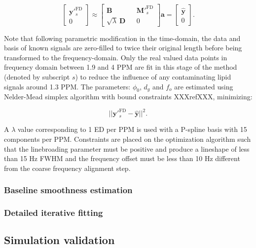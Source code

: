 \documentclass[num-refs]{wiley-article}
\begin{document}
\begin{equation}
  \begin{bmatrix}
    \textbf{y}'^{\mathrm{FD}}_{s} \\ 0
  \end{bmatrix}
  \approx
  \begin{bmatrix}
    \textbf{B} && \textbf{M}'^{\mathrm{FD}}_{s} \\ \sqrt{\lambda} \ \textbf{D} && 0
  \end{bmatrix} \hat{\mathbf{a}} =
  \begin{bmatrix}
    \hat{\textbf{y}} \\ 0
  \end{bmatrix}.
\end{equation}

Note that following parametric modification in the time-domain, the data and basis of known signals are zero-filled to twice their original length before being transformed to the frequency-domain. Only the real valued data points in frequency domain between 1.9 and 4 PPM are fit in this stage of the method (denoted by subscript $s$) to reduce the influence of any contaminating lipid signals around 1.3 PPM. The parameters: $\phi_{0}$, $d_{g}$ and $f_{o}$ are estimated using Nelder-Mead simplex algorithm with bound constraints XXXrefXXX, minimizing:

\begin{equation}
  || \textbf{y}'^{\mathrm{FD}}_{s}  - \hat{\textbf{y}} ||^{2}.
\end{equation}

A $\lambda$ value corresponding to 1 ED per PPM is used with a P-spline basis with 15 components per PPM. Constraints are placed on the optimization algorithm such that the linebroading parameter must be positive and produce a lineshape of less than 15 Hz FWHM and the frequency offset must be less than 10 Hz different from the coarse frequency alignment step.

\subsubsection{Baseline smoothness estimation}


\subsubsection{Detailed iterative fitting}


\subsection{Simulation validation}
\end{document}
